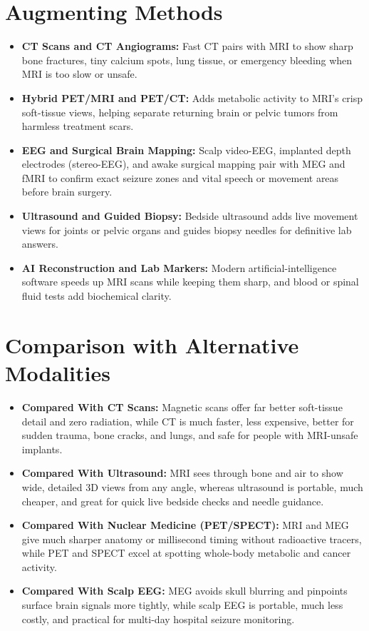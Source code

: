 \section{Augmenting Methods}
\begin{itemize}
  \item \textbf{CT Scans and CT Angiograms:} Fast CT pairs with MRI to show sharp bone fractures, tiny calcium spots, lung tissue, or emergency bleeding when MRI is too slow or unsafe.
  \item \textbf{Hybrid PET/MRI and PET/CT:} Adds metabolic activity to MRI's crisp soft-tissue views, helping separate returning brain or pelvic tumors from harmless treatment scars.
  \item \textbf{EEG and Surgical Brain Mapping:} Scalp video-EEG, implanted depth electrodes (stereo-EEG), and awake surgical mapping pair with MEG and fMRI to confirm exact seizure zones and vital speech or movement areas before brain surgery.
  \item \textbf{Ultrasound and Guided Biopsy:} Bedside ultrasound adds live movement views for joints or pelvic organs and guides biopsy needles for definitive lab answers.
  \item \textbf{AI Reconstruction and Lab Markers:} Modern artificial-intelligence software speeds up MRI scans while keeping them sharp, and blood or spinal fluid tests add biochemical clarity.
\end{itemize}

\section{Comparison with Alternative Modalities}
\begin{itemize}
  \item \textbf{Compared With CT Scans:} Magnetic scans offer far better soft-tissue detail and zero radiation, while CT is much faster, less expensive, better for sudden trauma, bone cracks, and lungs, and safe for people with MRI-unsafe implants.
  \item \textbf{Compared With Ultrasound:} MRI sees through bone and air to show wide, detailed 3D views from any angle, whereas ultrasound is portable, much cheaper, and great for quick live bedside checks and needle guidance.
  \item \textbf{Compared With Nuclear Medicine (PET/SPECT):} MRI and MEG give much sharper anatomy or millisecond timing without radioactive tracers, while PET and SPECT excel at spotting whole-body metabolic and cancer activity.
  \item \textbf{Compared With Scalp EEG:} MEG avoids skull blurring and pinpoints surface brain signals more tightly, while scalp EEG is portable, much less costly, and practical for multi-day hospital seizure monitoring.
\end{itemize}

